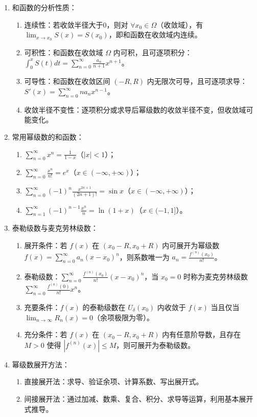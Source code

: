\documentclass[UTF8]{ctexart}
\theoremstyle{remark}
\begin{document}
\begin{enumerate}
	\item 和函数的分析性质：
	\begin{enumerate}
		\item 连续性：若收敛半径大于0，则对 \(\forall x_0 \in \Omega\)（收敛域），有 \(\lim_{x \to x_0}S(x) = S(x_0)\)，即和函数在收敛域内连续。
		\item 可积性：和函数在收敛域 \(\Omega\) 内可积，且可逐项积分：\(\int_{0}^{x}S(t)dt = \sum_{n=0}^{\infty}\frac{a_n}{n+1}x^{n+1}\)。
		\item 可导性：和函数在收敛区间 \((-R, R)\) 内无限次可导，且可逐项求导：\(S'(x) = \sum_{n=0}^{\infty}na_nx^{n-1}\)。
		\item 收敛半径不变性：逐项积分或求导后幂级数的收敛半径不变，但收敛域可能变化。
	\end{enumerate}
	
	\item 常用幂级数的和函数：
	\begin{enumerate}
		\item \(\sum_{n=0}^{\infty}x^n = \frac{1}{1-x}\)（\(|x| < 1\)）；
		\item \(\sum_{n=0}^{\infty}\frac{x^n}{n!} = e^x\)（\(x \in (-\infty, +\infty)\)）；
		\item \(\sum_{n=0}^{\infty}(-1)^n\frac{x^{2n+1}}{(2n+1)!} = \sin x\)（\(x \in (-\infty, +\infty)\)）；
		\item \(\sum_{n=1}^{\infty}(-1)^{n-1}\frac{x^n}{n} = \ln(1+x)\)（\(x \in (-1, 1]\)）。
	\end{enumerate}
	
	\item 泰勒级数与麦克劳林级数：
	\begin{enumerate}
		\item 展开条件：若 \(f(x)\) 在 \((x_0 - R, x_0 + R)\) 内可展开为幂级数 \(f(x) = \sum_{n=0}^{\infty}a_n(x - x_0)^n\)，则系数唯一为 \(a_n = \frac{f^{(n)}(x_0)}{n!}\)。
		\item 泰勒级数：\(\sum_{n=0}^{\infty}\frac{f^{(n)}(x_0)}{n!}(x - x_0)^n\)，当 \(x_0 = 0\) 时称为麦克劳林级数 \(\sum_{n=0}^{\infty}\frac{f^{(n)}(0)}{n!}x^n\)。
		\item 充要条件：\(f(x)\) 的泰勒级数在 \(U_{\delta}(x_0)\) 内收敛于 \(f(x)\) 当且仅当 \(\lim_{n \to \infty}R_n(x) = 0\)（余项极限为零）。
		\item 充分条件：若 \(f(x)\) 在 \((x_0 - R, x_0 + R)\) 内有任意阶导数，且存在 \(M > 0\) 使得 \(|f^{(n)}(x)| \leq M\)，则可展开为泰勒级数。
	\end{enumerate}
	
	\item 幂级数展开方法：
	\begin{enumerate}
		\item 直接展开法：求导、验证余项、计算系数、写出展开式。
		\item 间接展开法：通过加减、数乘、复合、积分、求导等运算，利用基本展开式推导。
	\end{enumerate}
	

\end{enumerate}
\end{document}
